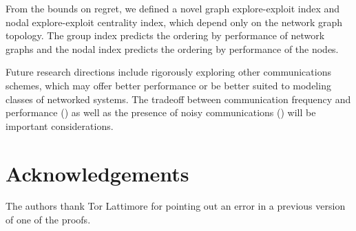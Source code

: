 \documentclass[final,5p,times,twocolumn]{elsarticle}
\theoremstyle{definition}
\begin{document}
From the bounds on regret, we defined a novel graph explore-exploit index and nodal explore-exploit centrality index, which  depend only on the network graph topology. The group index predicts the ordering by performance of network graphs and the nodal index predicts the ordering by performance of the nodes.  %

Future research directions include rigorously exploring other communications schemes, which may offer better performance or be better suited to modeling classes of networked systems.  The tradeoff between communication frequency and performance (\cite{madhushani2020observation}) as well as the presence of noisy communications (\cite{SavasACC2017}) will be important considerations.  

\section{Acknowledgements}
The authors thank Tor Lattimore for pointing out an error in a previous version of one of the proofs. 

%
%
\end{document}
